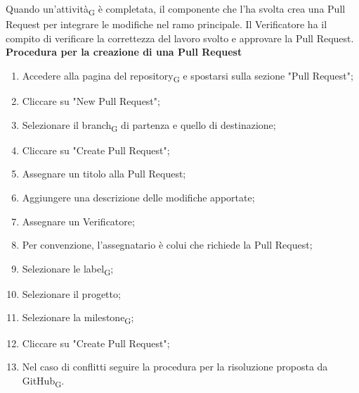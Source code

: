 {{
Quando un'{attività\textsubscript{G}} è completata, il componente che l'ha svolta crea una Pull Request per integrare le modifiche
nel ramo principale. Il Verificatore ha il compito di verificare la correttezza del lavoro svolto e approvare la Pull Request.
\textbf{Procedura per la creazione di una Pull Request} \label{pull_request}
\begin{enumerate}
    \item Accedere alla pagina del {repository\textsubscript{G}} e spostarsi sulla sezione "Pull Request";
    \item Cliccare su "New Pull Request";
    \item Selezionare il {branch\textsubscript{G}} di partenza e quello di destinazione;
    \item Cliccare su "Create Pull Request";
    \item Assegnare un titolo alla Pull Request;
    \item Aggiungere una descrizione delle modifiche apportate;
    \item Assegnare un Verificatore;
    \item Per convenzione, l'assegnatario è colui che richiede la Pull Request;
    \item Selezionare le {label\textsubscript{G}};
    \item Selezionare il progetto;
    \item Selezionare la {milestone\textsubscript{G}};
    \item Cliccare su "Create Pull Request";
    \item Nel caso di conflitti seguire la procedura per la risoluzione proposta da {GitHub\textsubscript{G}}.
\end{enumerate}

}}
